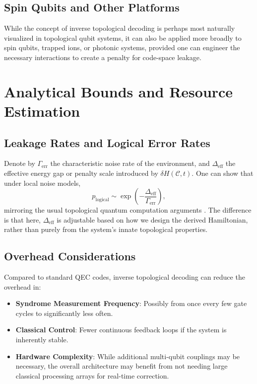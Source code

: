 \documentclass[11pt]{article}
\begin{document}
\subsection{Spin Qubits and Other Platforms}
While the concept of inverse topological decoding is perhaps most naturally visualized in topological qubit systems, it can also be applied more broadly to spin qubits, trapped ions, or photonic systems, provided one can engineer the necessary interactions to create a penalty for code-space leakage.

\section{Analytical Bounds and Resource Estimation}
\label{sec:bounds-resources}

\subsection{Leakage Rates and Logical Error Rates}
Denote by $\Gamma_{\mathrm{err}}$ the characteristic noise rate of the environment, and $\Delta_{\mathrm{eff}}$ the effective energy gap or penalty scale introduced by $\delta H(\mathcal{C}, t)$. One can show that under local noise models,
\begin{equation}
    p_{\mathrm{logical}} \sim \exp\left(-\frac{\Delta_{\mathrm{eff}}}{\Gamma_{\mathrm{err}}}\right),
\end{equation}
mirroring the usual topological quantum computation arguments \cite{Dennis2002, Terhal}. The difference is that here, $\Delta_{\mathrm{eff}}$ is adjustable based on how we design the derived Hamiltonian, rather than purely from the system’s innate topological properties.

\subsection{Overhead Considerations}
Compared to standard QEC codes, inverse topological decoding can reduce the overhead in:
\begin{itemize}
    \item \textbf{Syndrome Measurement Frequency}: Possibly from once every few gate cycles to significantly less often.
    \item \textbf{Classical Control}: Fewer continuous feedback loops if the system is inherently stable.
    \item \textbf{Hardware Complexity}: While additional multi-qubit couplings may be necessary, the overall architecture may benefit from not needing large classical processing arrays for real-time correction.
\end{itemize}
\end{document}
